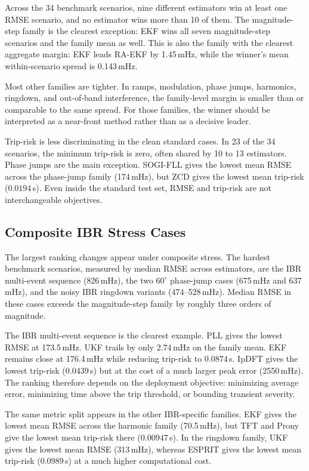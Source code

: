 Across the 34 benchmark scenarios, nine different estimators win at least one
RMSE scenario, and no estimator wins more than 10 of them. The
magnitude-step family is the clearest exception: EKF wins all seven
magnitude-step scenarios and the family mean as well. This is also the family
with the clearest aggregate margin: EKF leads RA-EKF by 1.45\,mHz, while the
winner's mean within-scenario spread is 0.143\,mHz.

Most other families are tighter. In ramps, modulation, phase jumps, harmonics,
ringdown, and out-of-band interference, the family-level margin is smaller than
or comparable to the same spread. For those families, the winner should be
interpreted as a near-front method rather than as a decisive leader.

Trip-risk is less discriminating in the clean standard cases. In 23 of the 34
scenarios, the minimum trip-risk is zero, often shared by 10 to 13 estimators.
Phase jumps are the main exception. SOGI-FLL gives the lowest mean RMSE across
the phase-jump family (174\,mHz), but ZCD gives the lowest mean trip-risk
($0.0194$\,s). Even inside the standard test set, RMSE and trip-risk are not
interchangeable objectives.

\subsection{Composite IBR Stress Cases}

The largest ranking changes appear under composite stress. The hardest
benchmark scenarios, measured by median RMSE across estimators, are the IBR
multi-event sequence (826\,mHz), the two $60^\circ$ phase-jump cases
(675\,mHz and 637\,mHz), and the noisy IBR ringdown variants
(474--528\,mHz). Median RMSE in these cases exceeds the magnitude-step family
by roughly three orders of magnitude.

The IBR multi-event sequence is the clearest example. PLL gives the lowest
RMSE at 173.5\,mHz. UKF trails by only 2.74\,mHz on the family mean. EKF
remains close at 176.4\,mHz while reducing trip-risk to $0.0874$\,s. IpDFT
gives the lowest trip-risk ($0.0439$\,s) but at the cost of a much larger peak
error (2550\,mHz). The ranking therefore depends on the deployment objective:
minimizing average error, minimizing time above the trip threshold, or bounding
transient severity.

The same metric split appears in the other IBR-specific families. EKF gives the
lowest mean RMSE across the harmonic family (70.5\,mHz), but TFT and Prony
give the lowest mean trip-risk there ($0.00947$\,s). In the ringdown family,
UKF gives the lowest mean RMSE (313\,mHz), whereas ESPRIT gives the lowest
mean trip-risk ($0.0989$\,s) at a much higher computational cost.

